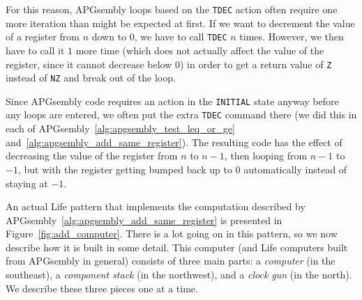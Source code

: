For this reason, APGsembly loops based on the \texttt{TDEC} action often require one more iteration than might be expected at first. If we want to decrement the value of a register from $n$ down to $0$, we have to call \texttt{TDEC} $n$ times. However, we then have to call it $1$ more time (which does not actually affect the value of the register, since it cannot decrease below $0$) in order to get a return value of \texttt{Z} instead of \texttt{NZ} and break out of the loop.

Since APGsembly code requires an action in the \texttt{INITIAL} state anyway before any loops are entered, we often put the extra \texttt{TDEC} command there (we did this in each of APGsembly~\ref{alg:apgsembly_test_leq_or_ge} and~\ref{alg:apgsembly_add_same_register}). The resulting code has the effect of decreasing the value of the register from $n$ to $n-1$, then looping from $n-1$ to $-1$, but with the register getting bumped back up to $0$ automatically instead of staying at $-1$.

An actual Life pattern that implements the computation described by APGsembly~\ref{alg:apgsembly_add_same_register} is presented in Figure~\ref{fig:add_computer}. There is a lot going on in this pattern, so we now describe how it is built in some detail. This computer (and Life computers built from APGsembly in general) consists of three main parts: a \emph{computer} (in the southeast), a \emph{component stack} (in the northwest), and a \emph{clock gun} (in the north). We describe these three pieces one at a time.

